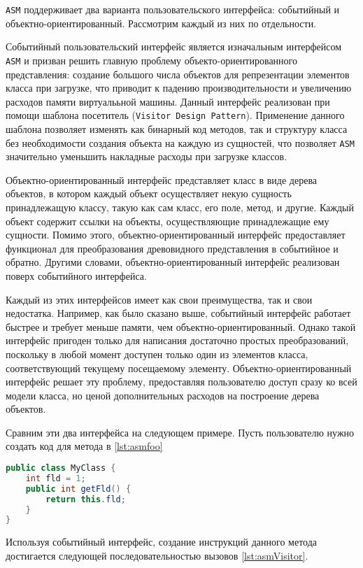 \texttt{ASM} поддерживает два варианта пользовательского интерфейса: событийный и объектно-ориентированный. Рассмотрим каждый из них по отдельности.

Событийный пользовательский интерфейс является изначальным интерфейсом \texttt{ASM} и призван решить главную проблему объекто-ориентированного представления: создание большого числа объектов для репрезентации элементов класса при загрузке, что приводит к падению производительности и увеличению расходов памяти виртуалььной машины. Данный интерфейс реализован при помощи шаблона посетитель (\texttt{Visitor~Design~Pattern}). Применение данного шаблона позволяет изменять как бинарный код методов, так и структуру класса без необходимости создания объекта на каждую из сущностей, что позволяет \texttt{ASM} значительно уменьшить накладные расходы при загрузке классов.

Объектно-ориентированный интерфейс представляет класс в виде дерева объектов, в котором каждый объект осуществляет некую сущность принадлежащую классу, такую как сам класс, его поле, метод, и другие. Каждый объект содержит ссылки на объекты, осуществляющие принадлежащие ему сущности. Помимо этого, объектно-ориентированный интерфейс предоставляет функционал для преобразования древовидного представления в событийное и обратно. Другими словами, объектно-ориентированный интерфейс реализован поверх событийного интерфейса.

Каждый из этих интерфейсов имеет как свои преимущества, так и свои недостатка. Например, как было сказано выше, событийный интерфейс работает быстрее и требует меньше памяти, чем объектно-ориентированный. Однако такой интерфейс пригоден только для написания достаточно простых преобразований, поскольку в любой момент доступен только один из элементов класса, соответствующий текущему посещаемому элементу. Объектно-ориентированный интерфейс решает эту проблему, предоставляя пользователю доступ сразу ко всей модели класса, но ценой дополнительных расходов на построение дерева объектов.

Сравним эти два интерфейса на следующем примере. Пусть пользователю нужно создать код для метода в \autoref{lst:asmfoo}

\begin{lstlisting}[language=Java, caption=Необходимый метод., label=lst:asmfoo]
public class MyClass {
    int fld = 1;
    public int getFld() {
        return this.fld;
    }
}
\end{lstlisting}

Используя событийный интерфейс, создание инструкций данного метода достигается следующей последовательностью вызовов \autoref{lst:asmVisitor}.

